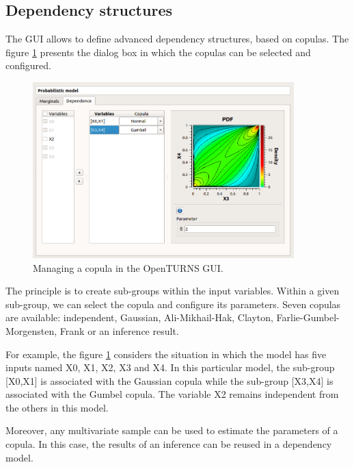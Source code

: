\documentclass{uncecomp2019}
\begin{document}

\subsection{Dependency structures}

The GUI allows to define advanced dependency structures, based on copulas. 
The figure \ref{fig-copula} presents the dialog box in which the copulas can be selected and 
configured. 

\begin{figure}
\centering
\includegraphics[width=0.9\textwidth]{figures/gui_dependence_screenshot.png}
\caption{Managing a copula in the OpenTURNS GUI.}
\label{fig-copula}
\end{figure}

The principle is to create sub-groups within the input variables. 
Within a given sub-group, we can select the copula and configure its parameters. 
Seven copulas are available: independent, Gaussian, Ali-Mikhail-Hak, Clayton, 
Farlie-Gumbel-Morgensten, Frank or an inference result.  

For example, the figure \ref{fig-copula} considers the situation in which the model has 
five inputs named X0, X1, X2, X3 and X4. 
In this particular model, the sub-group [X0,X1] is associated with the Gaussian copula while the 
sub-group [X3,X4] is associated with the Gumbel copula. 
The variable X2 remains independent from the others in this model. 

Moreover, any multivariate sample can be used to estimate the parameters of a 
copula. 
In this case, the results of an inference can be reused in a dependency model. 

\end{document}
